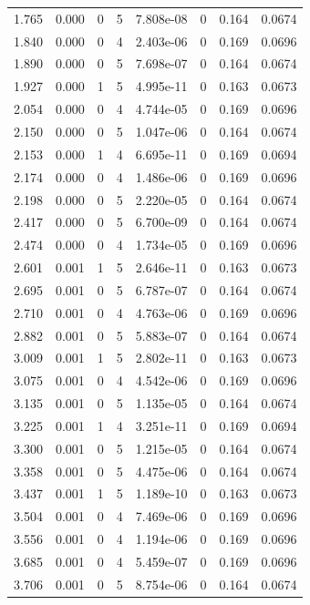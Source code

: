 \documentclass[preview]{standalone}
\begin{document}
{{\begin{tabular}{L{1.2cm}C{1.2cm} C{0.3cm}C{0.5cm} C{1.4cm}C{1.4cm} C{1.4cm}C{1.4cm}}
  1.765  &  0.000  & 0     &  5 &  7.808e-08  & 0  & 0.164 &  0.0674   \\ 
  1.840  &  0.000  & 0     &  4 &  2.403e-06  & 0  & 0.169 &  0.0696   \\ 
  1.890  &  0.000  & 0     &  5 &  7.698e-07  & 0  & 0.164 &  0.0674   \\ 
  1.927  &  0.000  & 1     &  5 &  4.995e-11  & 0  & 0.163 &  0.0673   \\ 
  2.054  &  0.000  & 0     &  4 &  4.744e-05  & 0  & 0.169 &  0.0696   \\ 
  2.150  &  0.000  & 0     &  5 &  1.047e-06  & 0  & 0.164 &  0.0674   \\ 
  2.153  &  0.000  & 1     &  4 &  6.695e-11  & 0  & 0.169 &  0.0694   \\ 
  2.174  &  0.000  & 0     &  4 &  1.486e-06  & 0  & 0.169 &  0.0696   \\ 
  2.198  &  0.000  & 0     &  5 &  2.220e-05  & 0  & 0.164 &  0.0674   \\ 
  2.417  &  0.000  & 0     &  5 &  6.700e-09  & 0  & 0.164 &  0.0674   \\ 
  2.474  &  0.000  & 0     &  4 &  1.734e-05  & 0  & 0.169 &  0.0696   \\ 
  2.601  &  0.001  & 1     &  5 &  2.646e-11  & 0  & 0.163 &  0.0673   \\ 
  2.695  &  0.001  & 0     &  5 &  6.787e-07  & 0  & 0.164 &  0.0674   \\ 
  2.710  &  0.001  & 0     &  4 &  4.763e-06  & 0  & 0.169 &  0.0696   \\ 
  2.882  &  0.001  & 0     &  5 &  5.883e-07  & 0  & 0.164 &  0.0674   \\ 
  3.009  &  0.001  & 1     &  5 &  2.802e-11  & 0  & 0.163 &  0.0673   \\ 
  3.075  &  0.001  & 0     &  4 &  4.542e-06  & 0  & 0.169 &  0.0696   \\ 
  3.135  &  0.001  & 0     &  5 &  1.135e-05  & 0  & 0.164 &  0.0674   \\ 
  3.225  &  0.001  & 1     &  4 &  3.251e-11  & 0  & 0.169 &  0.0694   \\ 
  3.300  &  0.001  & 0     &  5 &  1.215e-05  & 0  & 0.164 &  0.0674   \\ 
  3.358  &  0.001  & 0     &  5 &  4.475e-06  & 0  & 0.164 &  0.0674   \\ 
  3.437  &  0.001  & 1     &  5 &  1.189e-10  & 0  & 0.163 &  0.0673   \\ 
  3.504  &  0.001  & 0     &  4 &  7.469e-06  & 0  & 0.169 &  0.0696   \\ 
  3.556  &  0.001  & 0     &  4 &  1.194e-06  & 0  & 0.169 &  0.0696   \\ 
  3.685  &  0.001  & 0     &  4 &  5.459e-07  & 0  & 0.169 &  0.0696   \\ 
  3.706  &  0.001  & 0     &  5 &  8.754e-06  & 0  & 0.164 &  0.0674   \\ 
\hline 
\end{tabular} 

}}
\end{document}
